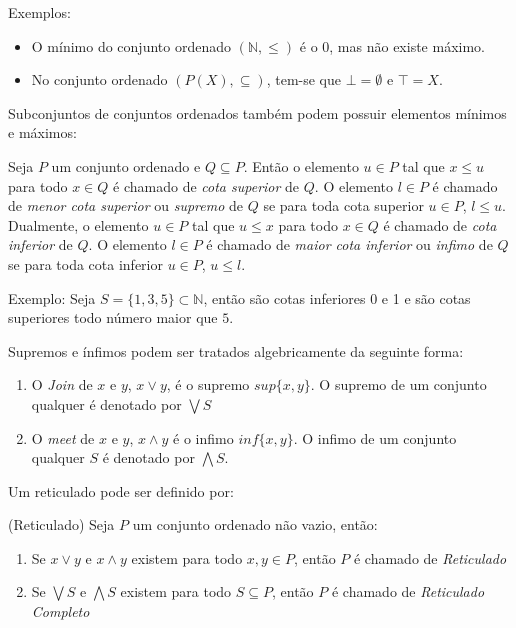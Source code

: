 \documentclass[../main.tex]{subfiles}
\begin{document}
Exemplos:
\begin{itemize}
    \item O mínimo do conjunto ordenado $(\mathbb{N}, \leq)$ é o $0$, mas não existe máximo.
    \item No conjunto ordenado $(P(X), \subseteq)$, tem-se que $\bot = \emptyset$ e $\top = X$. 
\end{itemize}

Subconjuntos de conjuntos ordenados também podem possuir elementos mínimos e máximos:

\begin{definition}
    Seja $P$ um conjunto ordenado e $Q \subseteq P$. Então o elemento $u \in P$ tal que $x \leq u$ para todo $x \in Q$ é chamado de \emph{cota superior} de $Q$. O elemento $l \in P$ é chamado de \emph{menor cota superior} ou \emph{supremo} de $Q$ se para toda cota superior $u \in P$, $l \leq u$. \\
    Dualmente, o elemento $u \in P$ tal que $u \leq x$ para todo $x \in Q$ é chamado de \emph{cota inferior} de $Q$. O elemento $l \in P$ é chamado de \emph{maior cota inferior} ou \emph{infimo} de $Q$ se para toda cota inferior $u \in P$, $u \leq l$.
\end{definition}


Exemplo: Seja $S = \{ 1, 3, 5\} \subset \mathbb{N}$, então são cotas inferiores 0 e 1 e são cotas superiores todo número maior que $5$.

Supremos e ínfimos podem ser tratados algebricamente da seguinte forma:

\begin{definition}
    \hfill
    \begin{enumerate}
        \item O \emph{Join} de $x$ e $y$, $x \vee y$, é o supremo $sup\{x, y\}$. O supremo de um conjunto qualquer é denotado por $\bigvee S$
        \item O \emph{meet} de $x$ e $y$, $ x \land y$ é o infimo $inf\{x, y\}$. O infimo de um conjunto qualquer $S$ é denotado por $\bigwedge S$. 
    \end{enumerate}
\end{definition}

Um reticulado pode ser definido por:

\begin{definition}(Reticulado)
    Seja $P$ um conjunto ordenado não vazio, então:
    \begin{enumerate}
        \item Se $x \vee y$ e $x \land y$ existem para todo $x, y \in P$, então $P$ é chamado de \emph{Reticulado}
        \item Se $\bigvee S$ e $\bigwedge S$ existem para todo $S \subseteq P$, então $P$ é chamado de \emph{Reticulado Completo}
    \end{enumerate}
\end{definition}
\end{document}
